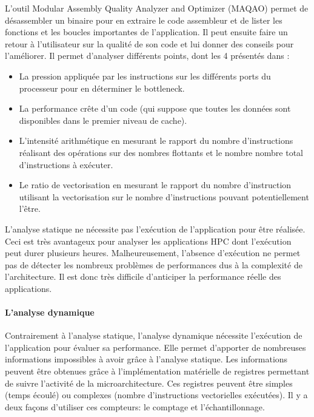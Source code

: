            L’outil Modular Assembly Quality Analyzer and Optimizer (MAQAO) \cite{Djoudi2005} permet de désassembler un binaire pour en extraire le code assembleur et de lister les fonctions et les boucles importantes de l’application. Il peut ensuite faire un retour à l’utilisateur sur la qualité de son code et lui donner des conseils pour l’améliorer. Il permet d'analyser différents points, dont les 4 présentés dans \cite{popov:tel-01412638} :
            \begin{itemize}
                \item La pression appliquée par les instructions sur les différents ports du processeur pour en déterminer le bottleneck.
                \item La performance crête d'un code (qui suppose que toutes les données sont disponibles dans le premier niveau de cache).
                \item L’intensité arithmétique en mesurant le rapport du nombre d’instructions réalisant des opérations sur des nombres flottants et le nombre nombre total d’instructions à exécuter.
                \item Le ratio de vectorisation en mesurant le rapport du nombre d’instruction utilisant la vectorisation sur le nombre d’instructions pouvant potentiellement l’être.
            \end{itemize}
                      
            L'analyse statique ne nécessite pas l'exécution de l'application pour être réalisée. Ceci est très avantageux pour analyser les applications \gls{HPC} dont l'exécution peut durer plusieurs heures. Malheureusement, l'absence d'exécution ne permet pas de détecter les nombreux problèmes de performances dus à la complexité de l'architecture. Il est donc très difficile d'anticiper la performance réelle des applications. 
                 
        \paragraph{L'analyse dynamique}\label{sec:hc_counting_sampling}
            
            Contrairement à l'analyse statique, l'analyse dynamique nécessite l'exécution de l'application pour évaluer sa performance. Elle permet d’apporter de nombreuses informations impossibles à avoir grâce à l’analyse statique. Les informations peuvent être obtenues grâce à l'implémentation matérielle de registres permettant de suivre l'activité de la microarchitecture. Ces registres peuvent être simples (temps écoulé) ou complexes (nombre d'instructions vectorielles exécutées). Il y a deux façons d'utiliser ces compteurs: le comptage et l'échantillonnage.
               
